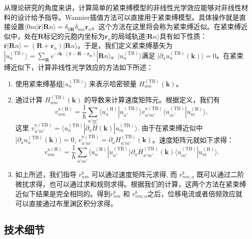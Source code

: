 从理论研究的角度来讲，计算简单的紧束缚模型的非线性光学效应能够对非线性材料的设计给予指导\cite{fregoso_quantitative_2016,cook_design_2017}。Wannier插值方法可以直接用于紧束缚模型。具体操作就是直接设置$\langle0m|\hat{\mathbf{r}}|\mathbf{R}n\rangle=\delta_{0\mathbf{R}}\delta_{mn}\mathbf{r}_{n}$。这个方法在这里将会称为紧束缚近似。在紧束缚近似中，处在$\mathbf{R}$标记的元胞内坐标为$\mathbf{r}_{n}$的局域轨道$|\mathbf{R}n\rangle$具有如下性质：$\hat{\mathbf{r}}|\mathbf{R}n\rangle=(\mathbf{R} + \mathbf{r}_{n}) |\mathbf{R}n\rangle$。于是，我们定义紧束缚基矢为$|u_{n}^{(\textrm{TB})}\rangle=\sum_{\mathbf{R}}e^{-i\mathbf{k}\cdot(\hat{\mathbf{r}}-\mathbf{R}-\mathbf{r_{n}})}|\mathbf{R}n\rangle$。$|u_{n}^{(\textrm{TB})}\rangle$满足 $|\partial_{a}u_{n}^{(\textrm{TB})}(\mathbf{k})\rangle=0$。在紧束缚近似下，计算非线性光学效应的方法如下所述：
\begin{enumerate}
	\item 使用紧束缚基组$|u_{n}^{(\textrm{TB})}\rangle$ 来表示哈密顿量 $H^{(\textrm{TB})}_{nm}(\mathbf{k})$。
	\item 通过计算 $H^{(\textrm{TB})}_{nm}(\mathbf{k})$ 的导数来计算速度矩阵元。根据定义，我们有\[
	v_{nm}^{a(\textrm{H})}=\frac{1}{\hbar}\sum_{n'm'}\langle u_{n}^{(\textrm{H})}|u_{n'}^{(\textrm{TB})}\rangle v_{n'm'}^{a(\textrm{TB})}\langle u_{m'}^{(\textrm{TB})}|u_{m}^{(\textrm{H})}\rangle,
	\]这里 $v_{n'm'}^{a(\textrm{TB})} = \langle u_{n}^{(\textrm{TB})}|\partial_{a}\hat{H}(\mathbf{k})|u_{m}^{(\textrm{TB})}\rangle$. 由于在紧束缚近似中 $|\partial_{a}u_{n}^{(\textrm{TB})}(\mathbf{k})\rangle=0$, $v_{n'm'}^{a(\textrm{TB})} = \partial_{a}H_{n'm'}^{(\textrm{TB})}(\mathbf{k})$。速度矩阵元就如下求得：
	\begin{equation}
	v_{nm}^{a(\textrm{H})}=\frac{1}{\hbar}\sum_{n'm'}\langle u_{n}^{(\textrm{H})}|u_{n'}^{(\textrm{TB})}\rangle\partial_{a}H_{n'm'}^{(\textrm{TB})}(\mathbf{k})\langle u_{m'}^{(\textrm{TB})}|u_{m}^{(\textrm{H})}\rangle.\label{eq:v-tight-binding}
	\end{equation}
	\item 如上所述，我们指导 $r_{nm}^{b}$ 可以通过速度矩阵元求得, 而 $r_{nm;a}^{b}$ 既可以通过二阶微扰求得，也可以通过求和规则求得。根据我们的计算，这两个方法在紧束缚近似下结果是完全相同的。得到$r_{nm}^{b}$ 和 $r_{nm;a}^{b}$之后，位移电流或者倍频效应就可以直接通过布里渊区积分求得。
\end{enumerate}

\subsection{技术细节}

